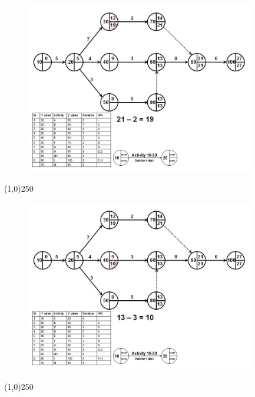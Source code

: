 \begin{frame}
\begin{figure}
	\centering
		\includegraphics[width = 10.0cm]{oldnotes/Slide116.jpg}
\end{figure}
\end{frame}
\begin{center}\line(1,0){250}\end{center}


\begin{frame}
\begin{figure}
	\centering
		\includegraphics[width = 10.0cm]{oldnotes/Slide117.jpg}
\end{figure}
\end{frame}
\begin{center}\line(1,0){250}\end{center}


